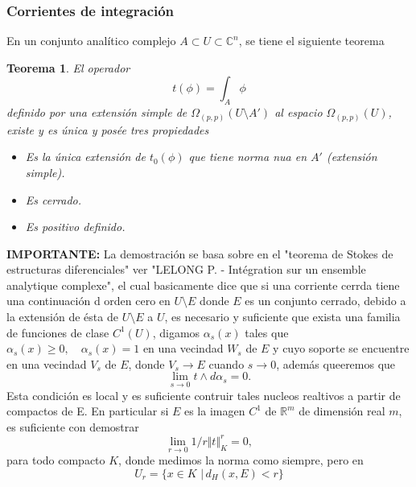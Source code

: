 \documentclass[letterpaper]{article}
\newtheorem{teorema}{Teorema}[section]
\newcommand{\con}{\ensuremath{\mathbb{C}^n}}
\newcommand{\re}{\ensuremath{\mathbb R }}
\begin{document}
\subsubsection{Corrientes de integración}
\label{sec:org5413ee4}
En un conjunto analítico complejo \(A\subset U\subset\con\), se tiene el siguiente teorema
\begin{teorema}
El operador
\[
    t(\phi)=\int_A\phi
\]
definido por una extensión simple de $\Omega_{(p,p)}(U\setminus A')$ al espacio $\Omega_{(p,p)}(U)$, existe y es única y posée tres propiedades
\begin{itemize}
    \item[a] Es la única extensión de $t_0(\phi)$ que tiene norma nua en $A'$ (extensión simple).
    \item[b] Es cerrado.
    \item[c] Es positivo definido.
\end{itemize}
\end{teorema}
\textbf{IMPORTANTE:} La demostración se basa sobre en el "teorema de Stokes de estructuras diferenciales" ver "LELONG P. - Intégration sur un ensemble analytique complexe", el cual basicamente dice que si una corriente cerrda tiene una continuación d orden cero en \(U\setminus E\) donde \(E\) es un conjunto cerrado, debido a la extensión de ésta de \(U\setminus E\) a \(U\), es necesario y suficiente que exista una familia de funciones de clase \(C^{1}(U)\), digamos \(\alpha_s(x)\) tales que \(\alpha_s(x)\geq0,\quad\alpha_s(x)=1\) en una vecindad \(W_s\) de \(E\) y cuyo soporte se encuentre en una vecindad \(V_s\) de \(E\), donde \(V_s\rightarrow E\) cuando \(s\rightarrow 0\), además queeremos que
\[
    \lim_{s\rightarrow 0}t\wedge d\alpha_s=0.
\]
Esta condición es local y es suficiente contruir tales nucleos realtivos a partir de compactos de E. En particular si \(E\) es la imagen \(C^1\) de \(\re^m\) de dimensión real \(m\), es suficiente con demostrar
\[
    \lim_{r\rightarrow 0}1/r\Vert t\Vert^{r}_K=0,
\]
para todo compacto \(K\), donde medimos la norma como siempre, pero en
\[
 U_r=\{x\in K\,\,\vert\,d_H(x,E)<r\}
\]
\end{document}
